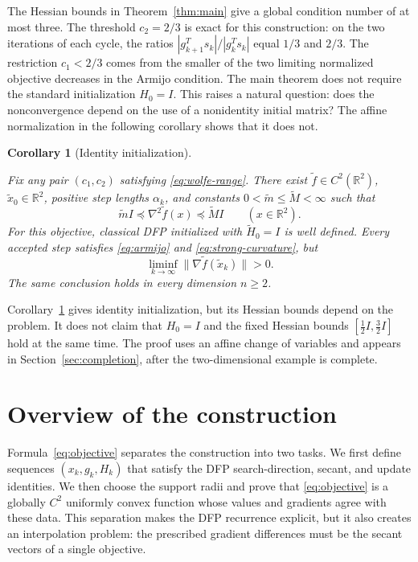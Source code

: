 \documentclass[11pt]{article}
\newtheorem{corollary}[theorem]{Corollary}
\newcommand{\R}{\mathbb R}
\begin{document}
The Hessian bounds in Theorem~\ref{thm:main} give a global condition number of
at most three.  The threshold $c_2=2/3$ is exact for this construction: on the
two iterations of each cycle, the ratios
$|g_{k+1}^Ts_k|/|g_k^Ts_k|$ equal $1/3$ and $2/3$.  The restriction $c_1<2/3$
comes from the smaller of the two limiting normalized objective decreases in
the Armijo condition.  The main theorem does not require the standard
initialization $H_0=I$.  This raises a natural question: does the
nonconvergence depend on the use of a nonidentity initial matrix?
The affine normalization in the following corollary shows that it does not.

\begin{corollary}[Identity initialization]\label{cor:identity-initialization}



Fix any pair $(c_1,c_2)$ satisfying \eqref{eq:wolfe-range}.  There exist
$\widetilde f\in C^2(\R^2)$, $\widetilde x_0\in\R^2$, positive step lengths $\alpha_k$,
and constants $0<\widetilde m\le \widetilde M<\infty$ such that
\[
\widetilde m I\preceq\nabla^2\widetilde f(x)
\preceq\widetilde M I\qquad(x\in\R^2).
\]
For this objective, classical DFP initialized with $\widetilde H_0=I$ is well
defined.  Every accepted step satisfies \eqref{eq:armijo} and
\eqref{eq:strong-curvature}, but
\[
\liminf_{k\to\infty}\|\nabla\widetilde f(\widetilde x_k)\|>0.
\]
The same conclusion holds in every dimension $n\ge2$.
\end{corollary}

Corollary~\ref{cor:identity-initialization} gives identity initialization, but
its Hessian bounds depend on the problem.  It does not claim that $H_0=I$ and
the fixed Hessian bounds $[\frac12 I,\frac32 I]$ hold at the same time.  The
proof uses an affine change of variables and appears in
Section~\ref{sec:completion}, after the two-dimensional example is complete.

\section{Overview of the construction}
\label{sec:strategy}

Formula~\eqref{eq:objective} separates the construction into two tasks.  We
first define sequences $(x_k,g_k,H_k)$ that satisfy the DFP search-direction,
secant, and update identities.  We then choose the support radii and prove that
\eqref{eq:objective} is a globally $C^2$ uniformly convex function whose
values and gradients agree with these data.  This separation makes the DFP
recurrence explicit, but it also creates an interpolation problem: the
prescribed gradient differences must be the secant vectors of a single
objective.
\end{document}
